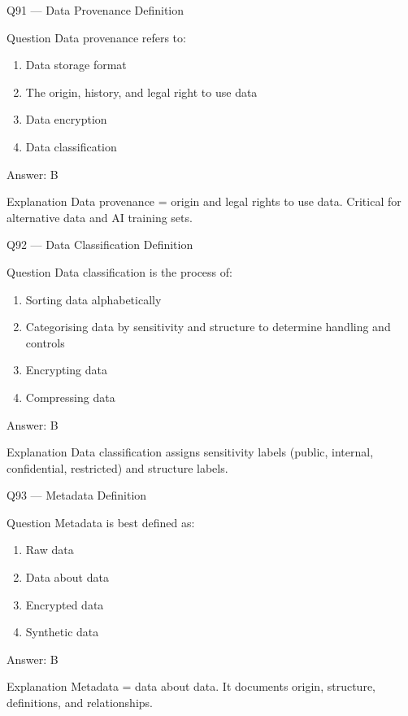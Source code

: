 \documentclass[aspectratio=169,8pt]{beamer}
\begin{document}
	\begin{frame}{Q91 --- Data Provenance Definition}
		\begin{block}{Question}
			Data provenance refers to:
			\begin{enumerate}
				\item Data storage format
				\item The origin, history, and legal right to use data
				\item Data encryption
				\item Data classification
			\end{enumerate}
		\end{block}
		\begin{exampleblock}{Answer: B}\end{exampleblock}
		\begin{block}{Explanation}
			Data provenance = origin and legal rights to use data. Critical for alternative data and AI training sets.
		\end{block}
	\end{frame}
	
	\begin{frame}{Q92 --- Data Classification Definition}
		\begin{block}{Question}
			Data classification is the process of:
			\begin{enumerate}
				\item Sorting data alphabetically
				\item Categorising data by sensitivity and structure to determine handling and controls
				\item Encrypting data
				\item Compressing data
			\end{enumerate}
		\end{block}
		\begin{exampleblock}{Answer: B}\end{exampleblock}
		\begin{block}{Explanation}
			Data classification assigns sensitivity labels (public, internal, confidential, restricted) and structure labels.
		\end{block}
	\end{frame}
	
	\begin{frame}{Q93 --- Metadata Definition}
		\begin{block}{Question}
			Metadata is best defined as:
			\begin{enumerate}
				\item Raw data
				\item Data about data
				\item Encrypted data
				\item Synthetic data
			\end{enumerate}
		\end{block}
		\begin{exampleblock}{Answer: B}\end{exampleblock}
		\begin{block}{Explanation}
			Metadata = data about data. It documents origin, structure, definitions, and relationships.
		\end{block}
	\end{frame}
	
\end{document}
